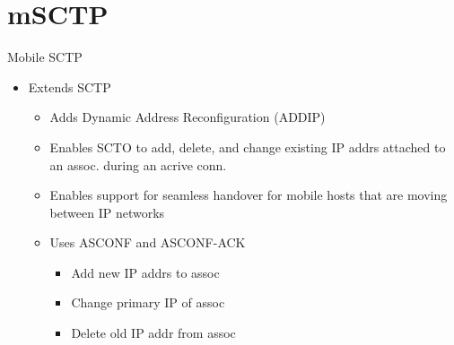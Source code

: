 \section{mSCTP}
Mobile SCTP
\begin{itemize}
	\item Extends SCTP
	\begin{itemize}
		\item Adds Dynamic Address Reconfiguration (ADDIP)
		\item Enables SCTO to add, delete, and change existing IP addrs
			attached to an assoc. during an acrive conn.
		\item Enables support for seamless handover for mobile hosts
			that are moving between IP networks
		\item Uses ASCONF and ASCONF-ACK
		\begin{itemize}
			\item Add new IP addrs to assoc
			\item Change primary IP of assoc
			\item Delete old IP addr from assoc
		\end{itemize}
	\end{itemize}
\end{itemize}
